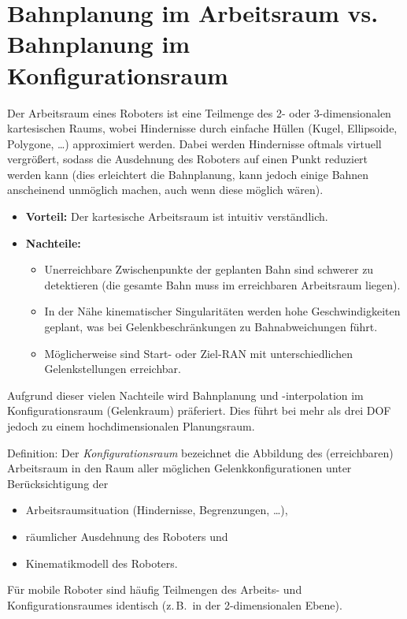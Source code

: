 \documentclass[a4paper, 11pt, accentcolor = tud3b]{tudreport}
\newcommand{\zB}{z.\,B.~}
\begin{document}
		\section{Bahnplanung im Arbeitsraum vs. Bahnplanung im Konfigurationsraum}
			Der Arbeitsraum eines Roboters ist eine Teilmenge des 2- oder 3-dimensionalen kartesischen Raums, wobei Hindernisse durch einfache Hüllen (Kugel, Ellipsoide, Polygone, \dots) approximiert werden. Dabei werden Hindernisse oftmals virtuell vergrößert, sodass die Ausdehnung des Roboters auf einen Punkt reduziert werden kann (dies erleichtert die Bahnplanung, kann jedoch einige Bahnen anscheinend unmöglich machen, auch wenn diese möglich wären).
			\begin{itemize}
				\item \textbf{Vorteil:} Der kartesische Arbeitsraum ist intuitiv verständlich.
				\item \textbf{Nachteile:}
					\begin{itemize}
						\item Unerreichbare Zwischenpunkte der geplanten Bahn sind schwerer zu detektieren (die gesamte Bahn muss im erreichbaren Arbeitsraum liegen).
						\item In der Nähe kinematischer Singularitäten werden hohe Geschwindigkeiten geplant, was bei Gelenkbeschränkungen zu Bahnabweichungen führt.
						\item Möglicherweise sind Start- oder Ziel-RAN mit unterschiedlichen Gelenkstellungen erreichbar.
					\end{itemize}
			\end{itemize}
			Aufgrund dieser vielen Nachteile wird Bahnplanung und -interpolation im Konfigurationsraum (Gelenkraum) präferiert. Dies führt bei mehr als drei DOF jedoch zu einem hochdimensionalen Planungsraum.
			
			Definition: Der \emph{Konfigurationsraum} bezeichnet die Abbildung des (erreichbaren) Arbeitsraum in den Raum aller möglichen Gelenkkonfigurationen unter Berücksichtigung der
			\begin{itemize}
				\item Arbeitsraumsituation (Hindernisse, Begrenzungen, \dots),
				\item räumlicher Ausdehnung des Roboters und
				\item Kinematikmodell des Roboters.
			\end{itemize}
			Für mobile Roboter sind häufig Teilmengen des Arbeits- und Konfigurationsraumes identisch (\zB in der 2-dimensionalen Ebene).
\end{document}
